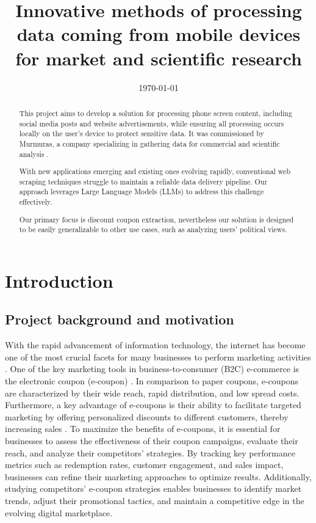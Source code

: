 \documentclass[licencjacka,en]{docs/pracamgr}
\title{Innovative methods of processing data coming from mobile devices for market and scientific research}
\date{\today}
\begin{document}
\maketitle

\begin{abstract}
    This project aims to develop a solution for processing phone screen content, including social media posts and website advertisements, while ensuring all processing occurs locally on the user's device to protect sensitive data. It was commissioned by Murmuras, a company specializing in gathering data for commercial and scientific analysis \cite{murmuras}.
    
    With new applications emerging and existing ones evolving rapidly, conventional web scraping techniques struggle to maintain a reliable data delivery pipeline. Our approach leverages Large Language Models (LLMs) to address this challenge effectively.

    Our primary focus is discount coupon extraction, nevertheless our solution is designed to be easily generalizable to other use cases, such as analyzing users' political views.
\end{abstract}

\tableofcontents

\chapter{Introduction}
\section{Project background and motivation}
With the rapid advancement of information technology, the internet has become one of the most crucial facets for many businesses to perform marketing activities \cite{design_of_coupons}. One of the key marketing tools in business-to-consumer (B2C) e-commerce is the electronic coupon (e-coupon) \cite{targeted_reminders}. In comparison to paper coupons, e-coupons are characterized by their wide reach, rapid distribution, and low spread costs. Furthermore, a key advantage of e-coupons is their ability to facilitate targeted marketing by offering personalized discounts to different customers, thereby increasing sales \cite{design_of_coupons}. To maximize the benefits of e-coupons, it is essential for businesses to assess the effectiveness of their coupon campaigns, evaluate their reach, and analyze their competitors’ strategies. By tracking key performance metrics such as redemption rates, customer engagement, and sales impact, businesses can refine their marketing approaches to optimize results. Additionally, studying competitors' e-coupon strategies enables businesses to identify market trends, adjust their promotional tactics, and maintain a competitive edge in the evolving digital marketplace. 
\end{document}
